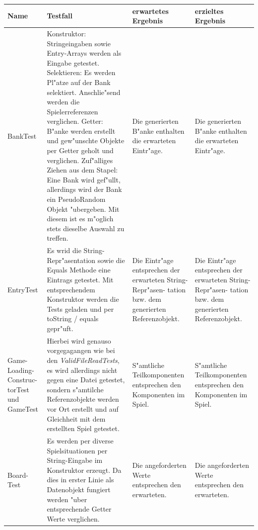 \begin{tabular}{|p{1.5cm}|p{7.5cm}|p{2cm}|p{2cm}|}
	\hline
	Name & Testfall & erwartetes Ergebnis & erzieltes Ergebnis \\
	\hline
	\hline
	
	BankTest & 
Konstruktor: Stringeingaben sowie Entry-Arrays werden als Eingabe getestet. 
	\newline Selektieren: Es werden Pl"atze auf der Bank selektiert. Anschlie"send werden die Spielerreferenzen verglichen.
	\newline Getter: B"anke werden erstellt und gew"unschte Objekte per Getter geholt und verglichen.
	\newline Zuf"alliges Ziehen aus dem Stapel: Eine Bank wird gef"ullt, allerdings wird der Bank ein PseudoRandom Objekt "ubergeben. Mit diesem ist es m"oglich stets dieselbe Auswahl zu treffen. 
	& Die generierten B"anke enthalten die erwarteten Eintr"age. 
 	& Die generierten B"anke enthalten die erwarteten Eintr"age. \\
 	
 	\hline 
 	
	EntryTest
	& Es wrid die String-Repr"asentation sowie die Equals Methode eine Eintrags getestet. Mit entsprechendem Konstruktor werden die Tests geladen und per toString / equals gepr"uft. 
	& Die Eintr"age entsprechen der erwarteten String-Repr"asen- \newline tation bzw. dem generierten Referenzobjekt.
	& Die Eintr"age entsprechen der erwarteten String-Repr"asen- \newline tation bzw. dem generierten Referenzobjekt. \\
	
 	\hline 
 	
 	Game- \newline Loading- \newline Construc- \newline torTest und GameTest
 	& Hierbei wird genauso vorgegagangen wie bei den \emph{ValidFileReadTests}, es wird allerdings nicht gegen eine Datei getestet, sondern s"amtilche Referenzobjekte werden vor Ort erstellt und auf Gleichheit mit dem erstellten Spiel getestet. 
 	& S"amtliche Teilkomponenten entsprechen den Komponenten im Spiel. 
 	& S"amtliche Teilkomponenten entsprechen den Komponenten im Spiel. \\
 	
  	\hline 
 	
	Board- \newline Test
	& Es werden per diverse Spielsituationen per String-Eingabe im Konstruktor erzeugt. Da dies in erster Linie als Datenobjekt fungiert werden "uber entsprechende Getter Werte verglichen. 
	& Die angeforderten Werte entsprechen den erwarteten. 
	& Die angeforderten Werte entsprechen den erwarteten. \\
	

\end{tabular}
